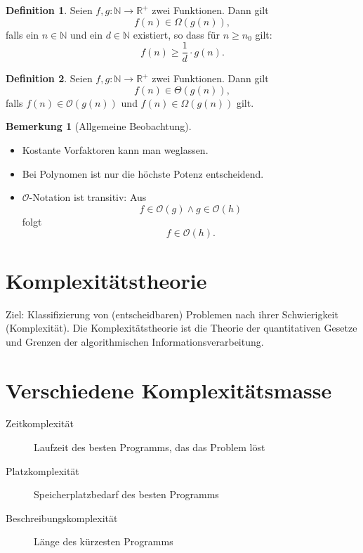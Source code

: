 \documentclass[11pt]{article} %
\theoremstyle{definition}
\newtheorem{definition}{Definition}
\newtheorem*{bemerkung}{Bemerkung}
\begin{document}
\begin{definition}
Seien $f, g : \mathbb{N} \rightarrow \mathbb{R}^+ $ zwei Funktionen. Dann gilt
\[
f(n) \in \Omega(g(n)),
\]
falls ein $n \in \mathbb{N}$ und ein $d \in \mathbb{N}$ existiert, so dass für $n \ge n_0$ gilt:
\[
f(n) \ge \frac 1 d \cdot g(n).
\]
\end{definition}

\begin{definition}
Seien $f, g : \mathbb{N} \rightarrow \mathbb{R}^+ $ zwei Funktionen. Dann gilt
\[
f(n) \in \Theta(g(n)),
\]
falls $f(n) \in \mathcal{O}(g(n))$ und $f(n) \in \Omega(g(n))$ gilt.
\end{definition}

\begin{bemerkung}[Allgemeine Beobachtung]
\begin{itemize}
\item Kostante Vorfaktoren kann man weglassen.
\item Bei Polynomen ist nur die höchste Potenz entscheidend.
\item $\mathcal{O}$-Notation ist transitiv: Aus
\[
	f \in \mathcal{O}(g) \land g \in \mathcal{O}(h)
\]
folgt
\[
	f \in \mathcal{O}(h).
\]
\end{itemize}
\end{bemerkung}

\section{Komplexitätstheorie}

Ziel: Klassifizierung von (entscheidbaren) Problemen nach ihrer Schwierigkeit (Komplexität). Die Komplexitätstheorie ist die Theorie der quantitativen Gesetze und Grenzen der algorithmischen Informationsverarbeitung.

\newcommand{\Time}{\operatorname{Time}}

\section{Verschiedene Komplexitätsmasse}

\begin{description}
\item[Zeitkomplexität] Laufzeit des besten Programms, das das Problem löst
\item[Platzkomplexität] Speicherplatzbedarf des besten Programms
\item[Beschreibungskomplexität] Länge des kürzesten Programms
\end{description}
\end{document}
